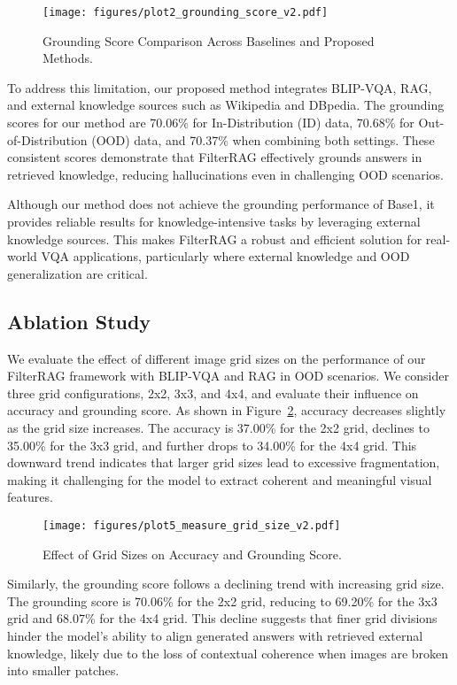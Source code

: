 \begin{figure}[h!]
    \centering
    \texttt{[image: figures/plot2\_grounding\_score\_v2.pdf]}
    \caption{Grounding Score Comparison Across Baselines and Proposed Methods.}
    \label{fig:plot2_grounding_score}
\end{figure}

To address this limitation, our proposed method integrates BLIP-VQA, RAG, and external knowledge sources such as Wikipedia and DBpedia. The grounding scores for our method are 70.06\% for In-Distribution (ID) data, 70.68\% for Out-of-Distribution (OOD) data, and 70.37\% when combining both settings. These consistent scores demonstrate that FilterRAG effectively grounds answers in retrieved knowledge, reducing hallucinations even in challenging OOD scenarios.

Although our method does not achieve the grounding performance of Base1, it provides reliable results for knowledge-intensive tasks by leveraging external knowledge sources. This makes FilterRAG a robust and efficient solution for real-world VQA applications, particularly where external knowledge and OOD generalization are critical.

\subsection{Ablation Study}
We evaluate the effect of different image grid sizes on the performance of our FilterRAG framework with BLIP-VQA and RAG in OOD scenarios. We consider three grid configurations, 2x2, 3x3, and 4x4, and evaluate their influence on accuracy and grounding score. As shown in Figure~\ref{fig:plot5_measure_grid_size}, accuracy decreases slightly as the grid size increases. The accuracy is 37.00\% for the 2x2 grid, declines to 35.00\% for the 3x3 grid, and further drops to 34.00\% for the 4x4 grid. This downward trend indicates that larger grid sizes lead to excessive fragmentation, making it challenging for the model to extract coherent and meaningful visual features.

\begin{figure}[h!]
    \centering
    \texttt{[image: figures/plot5\_measure\_grid\_size\_v2.pdf]}
    \caption{Effect of Grid Sizes on Accuracy and Grounding Score.}
    \label{fig:plot5_measure_grid_size}
\end{figure}

Similarly, the grounding score follows a declining trend with increasing grid size. The grounding score is 70.06\% for the 2x2 grid, reducing to 69.20\% for the 3x3 grid and 68.07\% for the 4x4 grid. This decline suggests that finer grid divisions hinder the model’s ability to align generated answers with retrieved external knowledge, likely due to the loss of contextual coherence when images are broken into smaller patches.

